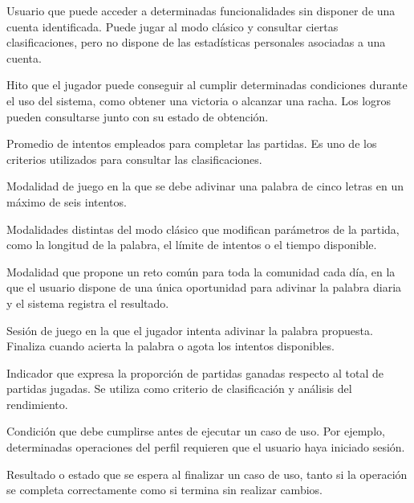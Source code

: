 \documentclass[a4paper,11pt]{article}
\begin{document}
\begin{description}[style=nextline,leftmargin=3.5cm,labelwidth=3.2cm]
    \item[Invitado]
    Usuario que puede acceder a determinadas funcionalidades sin disponer de una cuenta identificada. Puede jugar al modo clásico y consultar ciertas clasificaciones, pero no dispone de las estadísticas personales asociadas a una cuenta.

    \item[Logro]
    Hito que el jugador puede conseguir al cumplir determinadas condiciones durante el uso del sistema, como obtener una victoria o alcanzar una racha. Los logros pueden consultarse junto con su estado de obtención.

    \item[Media de intentos]
    Promedio de intentos empleados para completar las partidas. Es uno de los criterios utilizados para consultar las clasificaciones.

    \item[Modo clásico]
    Modalidad de juego en la que se debe adivinar una palabra de cinco letras en un máximo de seis intentos.

    \item[Modos de juego alternativos]
    Modalidades distintas del modo clásico que modifican parámetros de la partida, como la longitud de la palabra, el límite de intentos o el tiempo disponible.

    \item[Palabra diaria]
    Modalidad que propone un reto común para toda la comunidad cada día, en la que el usuario dispone de una única oportunidad para adivinar la palabra diaria y el sistema registra el resultado.

    \item[Partida]
    Sesión de juego en la que el jugador intenta adivinar la palabra propuesta. Finaliza cuando acierta la palabra o agota los intentos disponibles.

    \item[Porcentaje de victorias]
    Indicador que expresa la proporción de partidas ganadas respecto al total de partidas jugadas. Se utiliza como criterio de clasificación y análisis del rendimiento.

    \item[Precondición]
    Condición que debe cumplirse antes de ejecutar un caso de uso. Por ejemplo, determinadas operaciones del perfil requieren que el usuario haya iniciado sesión.

    \item[Poscondición]
    Resultado o estado que se espera al finalizar un caso de uso, tanto si la operación se completa correctamente como si termina sin realizar cambios.


\end{description}
\end{document}

